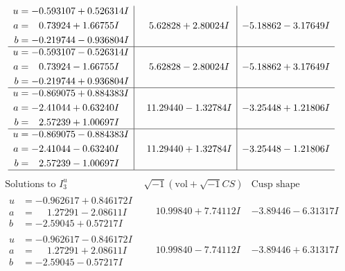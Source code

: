 \documentclass[1p]{elsarticle_modified}
\theoremstyle{definition}
\newcommand{\I}{\sqrt{-1}}
\begin{document}
$$\begin{array}{c|c|c}
\begin{aligned}
u &= -0.593107 + 0.526314 I \\
a &= \phantom{-}0.73924 + 1.66755 I \\
b &= -0.219744 - 0.936804 I\end{aligned}
 & \phantom{-}5.62828 + 2.80024 I & -5.18862 - 3.17649 I \\ \hline\begin{aligned}
u &= -0.593107 - 0.526314 I \\
a &= \phantom{-}0.73924 - 1.66755 I \\
b &= -0.219744 + 0.936804 I\end{aligned}
 & \phantom{-}5.62828 - 2.80024 I & -5.18862 + 3.17649 I \\ \hline\begin{aligned}
u &= -0.869075 + 0.884383 I \\
a &= -2.41044 + 0.63240 I \\
b &= \phantom{-}2.57239 + 1.00697 I\end{aligned}
 & \phantom{-}11.29440 - 1.32784 I & -3.25448 + 1.21806 I \\ \hline\begin{aligned}
u &= -0.869075 - 0.884383 I \\
a &= -2.41044 - 0.63240 I \\
b &= \phantom{-}2.57239 - 1.00697 I\end{aligned}
 & \phantom{-}11.29440 + 1.32784 I & -3.25448 - 1.21806 I\\
 \hline 
 \end{array}$$\newpage$$\begin{array}{c|c|c}  
\text{Solutions to }I^u_{3}& \I (\text{vol} + \sqrt{-1}CS) & \text{Cusp shape}\\
 \hline 
\begin{aligned}
u &= -0.962617 + 0.846172 I \\
a &= \phantom{-}1.27291 - 2.08611 I \\
b &= -2.59045 + 0.57217 I\end{aligned}
 & \phantom{-}10.99840 + 7.74112 I & -3.89446 - 6.31317 I \\ \hline\begin{aligned}
u &= -0.962617 - 0.846172 I \\
a &= \phantom{-}1.27291 + 2.08611 I \\
b &= -2.59045 - 0.57217 I\end{aligned}
 & \phantom{-}10.99840 - 7.74112 I & -3.89446 + 6.31317 I \\ \hline\begin{aligned}

\end{aligned}
\end{array}$$
\end{document}
